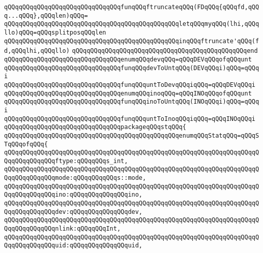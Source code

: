 \verb|qQQqqQQqqQQqqQQqqQQqqQQqqQQqqQQqfunqQQqftruncateqQQq(FDqQQq{qQQqfd,qQQq...qQQq},qQQqlen)qQQq=|\newline
\verb|qQQqqQQqqQQqqQQqqQQqqQQqqQQqqQQqqQQqqQQqqQQqqQQqletqQQqmyqQQq(lhi,qQQqllo)qQQq=qQQqsplitposqQQqlen|\newline
\verb|qQQqqQQqqQQqqQQqqQQqqQQqqQQqqQQqqQQqqQQqqQQqqQQqinqQQqftruncate'qQQq(fd,qQQqlhi,qQQqllo)|\newline
\verb|qQQqqQQqqQQqqQQqqQQqqQQqqQQqqQQqqQQqqQQqqQQqqQQqend|\newline
\newline
\verb|qQQqqQQqqQQqqQQqqQQqqQQqqQQqqQQqenumqQQqdevqQQq=qQQqDEVqQQqofqQQqunt|\newline
\verb|qQQqqQQqqQQqqQQqqQQqqQQqqQQqqQQqfunqQQqdevToUntqQQq(DEVqQQqi)qQQq=qQQqi|\newline
\verb|qQQqqQQqqQQqqQQqqQQqqQQqqQQqqQQqfunqQQquntToDevqQQqiqQQq=qQQqDEVqQQqi|\newline
\newline
\verb|qQQqqQQqqQQqqQQqqQQqqQQqqQQqqQQqenumqQQqinoqQQq=qQQqINOqQQqofqQQqunt|\newline
\verb|qQQqqQQqqQQqqQQqqQQqqQQqqQQqqQQqfunqQQqinoToUntqQQq(INOqQQqi)qQQq=qQQqi|\newline
\verb|qQQqqQQqqQQqqQQqqQQqqQQqqQQqqQQqfunqQQquntToInoqQQqiqQQq=qQQqINOqQQqi|\newline
\newline
\verb|qQQqqQQqqQQqqQQqqQQqqQQqqQQqqQQqpackageqQQqstqQQq{|\newline
\newline
\verb|qQQqqQQqqQQqqQQqqQQqqQQqqQQqqQQqqQQqqQQqqQQqqQQqenumqQQqStatqQQq=qQQqSTqQQqofqQQq{|\newline
\verb|qQQqqQQqqQQqqQQqqQQqqQQqqQQqqQQqqQQqqQQqqQQqqQQqqQQqqQQqqQQqqQQqqQQqqQQqqQQqqQQqqQQqftype:qQQqqQQqs_int,|\newline
\verb|qQQqqQQqqQQqqQQqqQQqqQQqqQQqqQQqqQQqqQQqqQQqqQQqqQQqqQQqqQQqqQQqqQQqqQQqqQQqqQQqqQQqmode:qQQqqQQqqQQqs::mode,|\newline
\verb|qQQqqQQqqQQqqQQqqQQqqQQqqQQqqQQqqQQqqQQqqQQqqQQqqQQqqQQqqQQqqQQqqQQqqQQqqQQqqQQqqQQqino:qQQqqQQqqQQqqQQqino,|\newline
\verb|qQQqqQQqqQQqqQQqqQQqqQQqqQQqqQQqqQQqqQQqqQQqqQQqqQQqqQQqqQQqqQQqqQQqqQQqqQQqqQQqqQQqdev:qQQqqQQqqQQqqQQqdev,|\newline
\verb|qQQqqQQqqQQqqQQqqQQqqQQqqQQqqQQqqQQqqQQqqQQqqQQqqQQqqQQqqQQqqQQqqQQqqQQqqQQqqQQqqQQqnlink:qQQqqQQqInt,|\newline
\verb|qQQqqQQqqQQqqQQqqQQqqQQqqQQqqQQqqQQqqQQqqQQqqQQqqQQqqQQqqQQqqQQqqQQqqQQqqQQqqQQqqQQquid:qQQqqQQqqQQqqQQquid,|\newline
